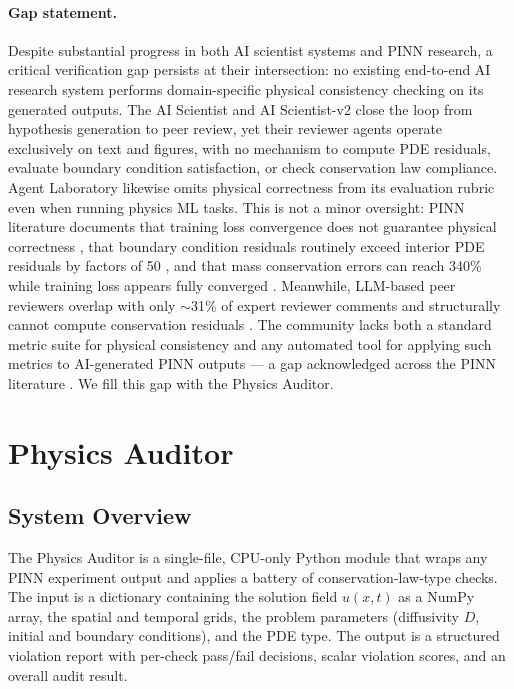 \documentclass{article}
\begin{document}
\paragraph{Gap statement.}
Despite substantial progress in both AI scientist systems and PINN research,
a critical verification gap persists at their intersection: no existing
end-to-end AI research system performs domain-specific physical consistency
checking on its generated outputs.
The AI Scientist \citep{Lu2024AIScientist} and AI Scientist-v2
\citep{Lu2025AIScientistV2} close the loop from hypothesis generation to peer
review, yet their reviewer agents operate exclusively on text and figures,
with no mechanism to compute PDE residuals, evaluate boundary condition
satisfaction, or check conservation law compliance.
Agent Laboratory \citep{Wang2024AgentLab} likewise omits physical correctness
from its evaluation rubric even when running physics ML tasks.
This is not a minor oversight: PINN literature documents that training loss
convergence does not guarantee physical correctness \citep{Rathore2024Challenges},
that boundary condition residuals routinely exceed interior PDE residuals by
factors of 50 \citep{Wang2022WhenPINNsFail}, and that mass conservation errors
can reach 340\% while training loss appears fully converged
\citep{Krishnapriyan2021Failures}.
Meanwhile, LLM-based peer reviewers overlap with only $\sim$31\% of expert
reviewer comments and structurally cannot compute conservation residuals
\citep{Liang2024LLMReview}.
The community lacks both a standard metric suite for physical consistency and
any automated tool for applying such metrics to AI-generated PINN outputs ---
a gap acknowledged across the PINN literature
\citep{Karniadakis2021Review, Cuomo2022ScientificML}.
We fill this gap with the Physics Auditor.

\section{Physics Auditor}

\subsection{System Overview}

The Physics Auditor is a single-file, CPU-only Python module that wraps any
PINN experiment output and applies a battery of conservation-law-type checks.
The input is a dictionary containing the solution field $u(x,t)$ as a NumPy
array, the spatial and temporal grids, the problem parameters (diffusivity
$D$, initial and boundary conditions), and the PDE type.
The output is a structured violation report with per-check pass/fail
decisions, scalar violation scores, and an overall audit result.
\end{document}
